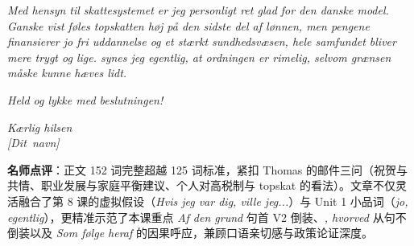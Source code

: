 \begin{answerbox}
\textit{Med hensyn til skattesystemet er jeg personligt ret glad for den danske model. Ganske vist føles topskatten høj på den sidste del af lønnen, men pengene finansierer jo fri uddannelse og et stærkt sundhedsvæsen,  hele samfundet bliver mere trygt og lige.  synes jeg egentlig, at ordningen er rimelig, selvom grænsen måske kunne hæves lidt.}

\textit{Held og lykke med beslutningen!}

\textit{Kærlig hilsen\\
\mbox{[Dit navn]}}

\small\textbf{名师点评}：正文 152 词完整超越 125 词标准，紧扣 Thomas 的邮件三问（祝贺与共情、职业发展与家庭平衡建议、个人对高税制与 topskat 的看法）。文章不仅灵活融合了第 8 课的虚拟假设（\textit{Hvis jeg var dig, ville jeg...}）与 Unit 1 小品词（\textit{jo, egentlig}），更精准示范了本课重点 \textit{Af den grund} 句首 V2 倒装、\textit{, hvorved} 从句不倒装以及 \textit{Som følge heraf} 的因果呼应，兼顾口语亲切感与政策论证深度。
\end{answerbox}